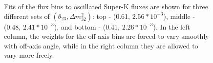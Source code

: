 \begin{figure}
\begin{minipage}[t]{1.0\textwidth}
\begin{center}
\end{center}
\end{minipage}
\caption{Fits of the \nuprismlite flux bins to oscillated Super-K fluxes are shown for three different sets of $\left(\theta_{23},\Delta m^2_{32}\right)$: top - (0.61, $2.56*10^{-3}$), middle - (0.48, $2.41*10^{-3}$), and bottom - (0.41, $2.26*10^{-3}$). In the left column, the weights for the off-axis bins are forced to vary smoothly with off-axis angle, while in the right column they are allowed to vary more freely.}
\label{fig:fluxesevents_smooth}
\end{figure}










